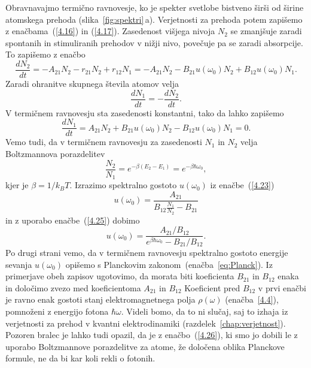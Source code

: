 Obravnavajmo termično ravnovesje, ko je spekter svetlobe bistveno širši
od širine atomskega prehoda (slika~\ref{fig:spektri}\,a). Verjetnosti za prehoda potem
zapišemo z enačbama~(\ref{4.16}) in (\ref{4.17}). Zasedenost višjega nivoja $N_2$
se zmanjšuje zaradi spontanih in stimuliranih prehodov v nižji nivo, 
povečuje pa se zaradi absorpcije. To zapišemo z enačbo
\begin{equation}
\frac{dN_{2}}{dt}=-A_{21}N_2 - r_{21}N_2 + r_{12}N_1 = 
-A_{21}N_{2}-B_{21}u(\omega_{0})N_{2}+B_{12}u(\omega_{0})N_{1}.
\label{4.22}
\end{equation}
Zaradi ohranitve skupnega števila atomov velja 
\begin{equation}
\frac{dN_{1}}{dt}=-\frac{dN_{2}}{dt}.
\end{equation}
V termičnem ravnovesju sta zasedenosti konstantni, tako da lahko zapišemo 
\begin{equation}
\frac{dN_{1}}{dt}=A_{21}N_{2}+B_{21}u(\omega_{0})N_{2}-B_{12}u(\omega_{0})N_{1}=0.
\label{4.23}
\end{equation}
Vemo tudi, da v termičnem ravnovesju za zasedenosti $N_{1}$ in $N_{2}$ velja
Boltzmannova porazdelitev
\begin{equation}
\frac{N_{2}}{N_{1}}=e^{-\beta(E_{2}-E_{1})} = e^{-\beta \hbar \omega_0},
\label{4.25}
\end{equation}
kjer je $\beta=1/k_BT$. Izrazimo spektralno gostoto $u(\omega_0)$ 
iz enačbe~(\ref{4.23})
\begin{equation}
u(\omega_{0})=\frac{A_{21}}{B_{12}\frac{N_{1}}{N_{2}}-B_{21}}
\label{4.24}
\end{equation}
in z uporabo enačbe~(\ref{4.25}) dobimo
\begin{equation}
u(\omega_{0})=\frac{A_{21}/B_{12}}{e^{\beta\hbar\omega_{0}}-B_{21}/B_{12}}.
\label{4.26}
\end{equation}
Po drugi strani vemo, da v termičnem ravnovesju spektralno gostoto energije sevanja
$u(\omega_0)$ opišemo s Planckovim zakonom~(enačba~\ref{eq:Planck}).
Iz primerjave obeh zapisov ugotovimo, da morata biti koeficienta $B_{21}$ in $B_{12}$ enaka in
določimo zvezo med koeficientoma $A_{21}$ in $B_{12}$  
Koeficient pred $B_{12}$ v prvi enačbi je ravno enak gostoti stanj elektromagnetnega polja 
$\rho(\omega)$ (enačba~\ref{4.4}), pomnoženi z energijo fotona $\hbar\omega$. 
Videli bomo, da to ni slučaj, saj to izhaja iz verjetnosti za prehod v kvantni 
elektrodinamiki (razdelek~\ref{chap:verjetnost}).
Pozoren bralec je lahko tudi opazil, da je z enačbo~(\ref{4.26}),
ki smo jo dobili le z uporabo Boltzmannove porazdelitve za atome, že
določena oblika Planckove formule, ne da bi kar koli rekli o fotonih.

